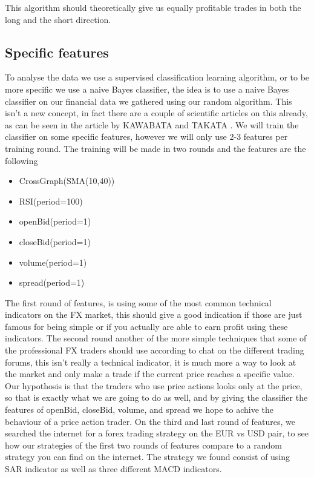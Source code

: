 \documentclass[10pt]{IEEEtran}
\begin{document}
This algorithm should theoretically give us equally profitable trades in both the long and the short direction.

\subsection{Specific features}
To analyse the data we use a supervised classification learning algorithm, or to be more specific we use a naive Bayes classifier, the idea is to use a naive Bayes classifier on our financial data we gathered using our random algorithm. This isn't a new concept, in fact there are a couple of scientific articles on this already, as can be seen in the article by KAWABATA and TAKATA \cite{fxNaiveBayes}. We will train the classifier on some specific features, however we will only use 2-3 features per training round. The training will be made in two rounds and the features are the following
\begin{itemize}
	\item{CrossGraph(SMA(10,40))}
	\item{RSI(period=100)}
	\item{openBid(period=1)}
	\item{closeBid(period=1)}
	\item{volume(period=1)}
	\item{spread(period=1)}
\end{itemize}

The first round of features, is using some of the most common technical indicators on the FX market, this should give a good indication if those are just famous for being simple or if you actually are able to earn profit using these indicators. The second round another of the more simple techniques that some of the professional FX traders should use according to chat on the different trading forums, this isn't really a technical indicator, it is much more a way to look at the market and only make a trade if the current price reaches a specific value. Our hypothosis is that the traders who use price actions looks only at the price, so that is exactly what we are going to do as well, and by giving the classifier the features of openBid, closeBid, volume, and spread we hope to achive the behaviour of a price action trader. On the third and last round of features, we searched the internet for a forex trading strategy on the EUR vs USD pair, to see how our strategies of the first two rounds of features compare to a random strategy you can find on the internet. The strategy we found consist of using SAR indicator as well as three different MACD indicators.
\end{document}
